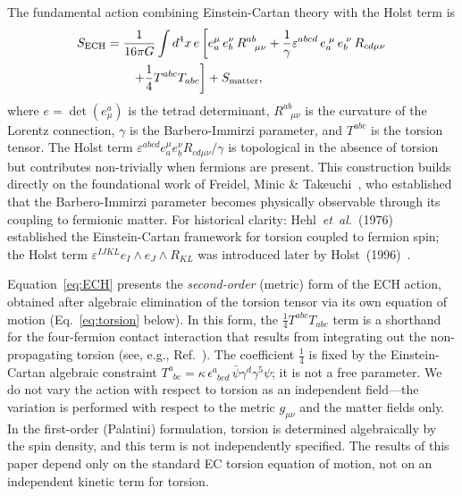\documentclass[aps,prd,twocolumn,superscriptaddress,showpacs,preprintnumbers,nofootinbib,longbibliography,floatfix]{revtex4-2}
\newcommand{\etal}{\textit{et~al.}}
\begin{document}
The fundamental action combining Einstein-Cartan theory with the Holst term is
\begin{align}\label{eq:ECH}
S_{\rm ECH} &= \frac{1}{16\pi G} \int d^4x\, e \left[e^\mu_a\,e^\nu_b\,R^{ab}_{\;\;\;\mu\nu} + \frac{1}{\gamma} \varepsilon^{abcd}\,e_{a}^{\;\mu}\,e_{b}^{\;\nu}\,R_{cd\mu\nu} \right.\nonumber\\
&\qquad\left.+ \frac{1}{4} T^{abc} T_{abc}\right] + S_{\rm matter},
\end{align}
where $e = \det(e^a_\mu)$ is the tetrad determinant, $R^{ab}_{\;\;\;\mu\nu}$ is the curvature of the Lorentz connection, $\gamma$ is the Barbero-Immirzi parameter, and $T^{abc}$ is the torsion tensor. The Holst term $\varepsilon^{abcd}e_a^\mu e_b^\nu R_{cd\mu\nu}/\gamma$ is topological in the absence of torsion but contributes non-trivially when fermions are present. This construction builds directly on the foundational work of Freidel, Minic \& Takeuchi~\cite{Freidel2005}, who established that the Barbero-Immirzi parameter becomes physically observable through its coupling to fermionic matter. For historical clarity: Hehl~\etal~(1976)~\cite{Hehl1976} established the Einstein-Cartan framework for torsion coupled to fermion spin; the Holst term $\varepsilon^{IJKL}e_I\wedge e_J\wedge R_{KL}$ was introduced later by Holst~(1996)~\cite{Holst1996}.

Equation~\eqref{eq:ECH} presents the \textit{second-order} (metric) form of the ECH action, obtained after algebraic elimination of the torsion tensor via its own equation of motion (Eq.~\ref{eq:torsion} below). In this form, the $\frac{1}{4}T^{abc}T_{abc}$ term is a shorthand for the four-fermion contact interaction that results from integrating out the non-propagating torsion (see, e.g., Ref.~\cite{Hehl1976}). The coefficient $\frac{1}{4}$ is fixed by the Einstein-Cartan algebraic constraint $T^{a}_{\phantom{a}bc} = \kappa\,\epsilon^{a}_{\phantom{a}bcd}\,\bar{\psi}\gamma^{d}\gamma^{5}\psi$; it is not a free parameter. We do not vary the action with respect to torsion as an independent field---the variation is performed with respect to the metric $g_{\mu\nu}$ and the matter fields only. In the first-order (Palatini) formulation, torsion is determined algebraically by the spin density, and this term is not independently specified. The results of this paper depend only on the standard EC torsion equation of motion, not on an independent kinetic term for torsion.
\end{document}
